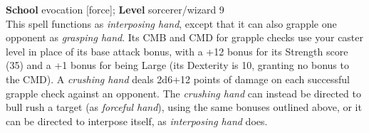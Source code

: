 \textbf{School }evocation [force]; \textbf{Level }sorcerer/wizard 9\\
This spell functions as \textit{interposing hand}, except that it can also grapple one opponent as \textit{grasping hand}. Its CMB and CMD for grapple checks use your caster level in place of its base attack bonus, with a +12 bonus for its Strength score (35) and a +1 bonus for being Large (its Dexterity is 10, granting no bonus to the CMD). A \textit{crushing hand }deals 2d6+12 points of damage on each successful grapple check against an opponent. The \textit{crushing hand} can instead be directed to bull rush a target (as \textit{forceful hand}), using the same bonuses outlined above, or it can be directed to interpose itself, as \textit{interposing hand} does.\\
